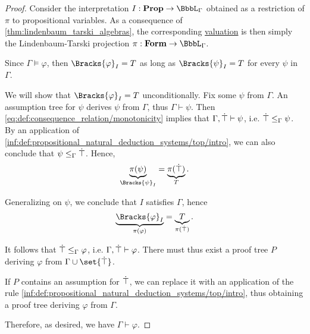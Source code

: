 \begin{proof}
  Consider the interpretation \( I: \op*{Prop} \to \BbbL_\Gamma \) obtained as a restriction of \( \pi \) to propositional variables. As a consequence of \cref{thm:lindenbaum_tarski_algebras}, the corresponding \hyperref[def:propositional_valuation/formula_valuation]{valuation} is then simply the Lindenbaum-Tarski projection \( \pi: \op*{Form} \to \BbbL_\Gamma \).

  Since \( \Gamma \vDash \varphi \), then \( \Bracks{\varphi}_I = T \) as long as \( \Bracks{\psi}_I = T \) for every \( \psi \) in \( \Gamma \).

  We will show that \( \Bracks{\varphi}_I = T \) unconditionally. Fix some \( \psi \) from \( \Gamma \). An assumption tree for \( \psi \) derives \( \psi \) from \( \Gamma \), thus \( \Gamma \vdash \psi \). Then \eqref{eq:def:consequence_relation/monotonicity} implies that \( \Gamma, \dot{\top} \vdash \psi \), i.e. \( \dot{\top} \leq_\Gamma \psi \). By an application of \ref{inf:def:propositional_natural_deduction_systems/top/intro}, we can also conclude that \( \psi \leq_\Gamma \dot{\top} \). Hence,
  \begin{equation*}
    \underbrace{\pi(\psi)}_{\Bracks{\psi}_I} = \underbrace{\pi(\syntop)}_{T}.
  \end{equation*}

  Generalizing on \( \psi \), we conclude that \( I \) satisfies \( \Gamma \), hence
  \begin{equation*}
    \underbrace{\Bracks{\varphi}_I}_{\pi(\varphi)} = \underbrace{T}_{\pi(\syntop)}.
  \end{equation*}

  It follows that \( \dot{\top} \leq_\Gamma \varphi \), i.e. \( \Gamma, \dot{\top} \vdash \varphi \). There must thus exist a proof tree \( P \) deriving \( \varphi \) from \( \Gamma \cup \set{ \syntop } \).

  If \( P \) contains an assumption for \( \dot{\top} \), we can replace it with an application of the rule \ref{inf:def:propositional_natural_deduction_systems/top/intro}, thus obtaining a proof tree deriving \( \varphi \) from \( \Gamma \).

  Therefore, as desired, we have \( \Gamma \vdash \varphi \).
\end{proof}

